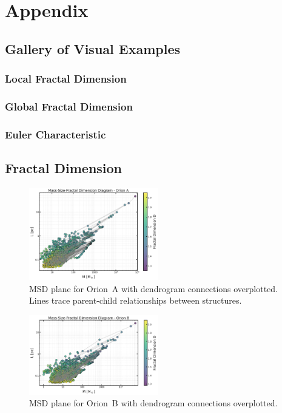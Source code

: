 \chapter{Appendix}

\section{Gallery of Visual Examples}

\subsection{Local Fractal Dimension}

\subsection{Global Fractal Dimension}

\subsection{Euler Characteristic}

\section{Fractal Dimension}

\begin{figure}[t]
    \centering
    \includegraphics[width=0.5\textwidth]{figures/MSD_Orion_A_with_lines.png}
    \caption{MSD plane for Orion~A with dendrogram connections overplotted. Lines trace parent-child relationships between structures.}
    \label{fig:MSD_orion_A_lines}
\end{figure}

\begin{figure}[t]
    \centering
    \includegraphics[width=0.5\textwidth]{figures/MSD_Orion_B_with_lines.png}
    \caption{MSD plane for Orion~B with dendrogram connections overplotted.}
    \label{fig:MSD_orion_B_lines}
\end{figure}


